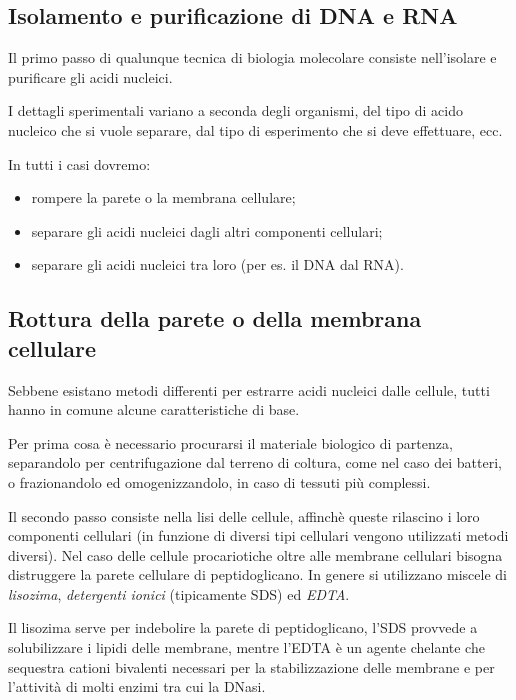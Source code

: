 \documentclass[11pt]{book}
\begin{document}
\subsection{Isolamento e purificazione di DNA e
RNA}\label{isolamento-e-purificazione-di-dna-e-rna}

Il primo passo di qualunque tecnica di biologia molecolare consiste
nell'isolare e purificare gli acidi nucleici.

I dettagli sperimentali variano a seconda degli organismi, del tipo di
acido nucleico che si vuole separare, dal tipo di esperimento che si
deve effettuare, ecc.

In tutti i casi dovremo:

\begin{itemize}
\itemsep1pt\parskip0pt
\item
  rompere la parete o la membrana cellulare;
\item
  separare gli acidi nucleici dagli altri componenti cellulari;
\item
  separare gli acidi nucleici tra loro (per es. il DNA dal RNA).
\end{itemize}

\subsection{Rottura della parete o della membrana
cellulare}\label{rottura-della-parete-o-della-membrana-cellulare}

Sebbene esistano metodi differenti per estrarre acidi nucleici dalle
cellule, tutti hanno in comune alcune caratteristiche di base.

Per prima cosa è necessario procurarsi il materiale biologico di
partenza, separandolo per centrifugazione dal terreno di coltura, come
nel caso dei batteri, o frazionandolo ed omogenizzandolo, in caso di
tessuti più complessi.

Il secondo passo consiste nella lisi delle cellule, affinchè queste
rilascino i loro componenti cellulari (in funzione di diversi tipi
cellulari vengono utilizzati metodi diversi). Nel caso delle cellule
procariotiche oltre alle membrane cellulari bisogna distruggere la
parete cellulare di peptidoglicano. In genere si utilizzano miscele di
\emph{lisozima}, \emph{detergenti ionici} (tipicamente SDS) ed
\emph{EDTA}.

Il lisozima serve per indebolire la parete di peptidoglicano, l'SDS
provvede a solubilizzare i lipidi delle membrane, mentre l'EDTA è un
agente chelante che sequestra cationi bivalenti necessari per la
stabilizzazione delle membrane e per l'attività di molti enzimi tra cui
la DNasi.
\end{document}
